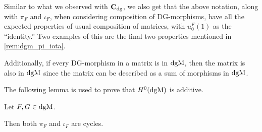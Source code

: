 Similar to what we observed with \( \operatorname{\mathbf{C}}_{\operatorname{dg}} \), we also get that the above notation, along with \( \pi_F \) and \( \iota_F \), when considering composition of DG-morphisms, have all the expected properties of usual composition of matrices, with \( u_0^F(1) \) as the ``identity.'' Two examples of this are the final two properties mentioned in \autoref{rem:dgm_pi_iota}.

Additionally, if every DG-morphism in a matrix is in \( \operatorname{dgM} \), then the matrix is also in \( \operatorname{dgM} \) since the matrix can be described as a sum of morphisms in \( \operatorname{dgM} \).

The following lemma is used to prove that \( H^0(\operatorname{dgM}) \) is additive.

\begin{lemma}
    \label{lem:dgm_pi_iota_cycles}
    Let \( F, G \in \operatorname{dgM} \).
    
    Then both \( \pi_F \) and \( \iota_F \) are cycles.
\end{lemma}
